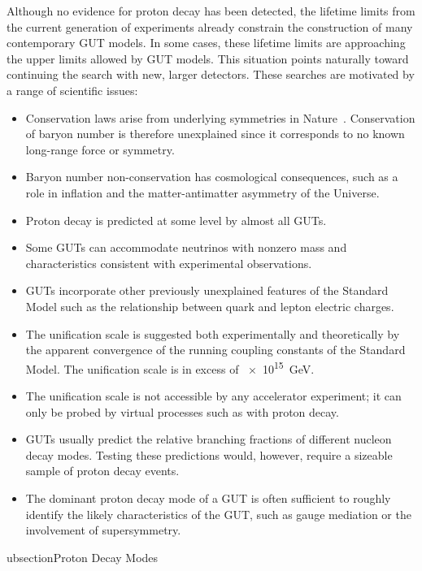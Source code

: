 Although no evidence for proton decay has been detected, the lifetime
limits from the current generation of experiments already constrain
the construction of many contemporary GUT %
models. In some cases, these lifetime limits are approaching the upper limits
allowed
by GUT models.
This situation points naturally toward continuing the search with new, larger
detectors.
These searches are motivated by a range of scientific issues:
\begin{itemize}
\item Conservation laws arise from underlying symmetries in
Nature~\cite{Noether:1918zz}.  
  Conservation of baryon number is therefore
  unexplained since it corresponds to no known long-range force or
  symmetry.
\item Baryon number non-conservation has cosmological consequences,
  such as a role in inflation and the matter-antimatter asymmetry of the
  Universe.
\item Proton decay is predicted at some level by almost all GUTs. 
\item Some GUTs can accommodate
  neutrinos with nonzero mass and characteristics consistent with
  experimental observations.
\item GUTs incorporate other previously unexplained features of
  the Standard Model such as the relationship between quark and lepton
  electric charges. 
\item The unification scale is suggested both experimentally and
  theoretically by the apparent convergence of the running coupling
  constants of the Standard Model. The unification scale is in excess of
\SI{e15}{GeV}.%
\item The unification scale is not accessible by any accelerator
  experiment; it can only be probed by virtual processes such as with
  proton decay.
\item GUTs usually predict the relative branching
  fractions of different nucleon decay modes. Testing these predictions
  would, however, require a sizeable sample of proton decay events.
\item The dominant proton decay mode of a GUT is often sufficient to roughly
  identify the likely characteristics of the GUT,
  such as gauge mediation or the involvement of supersymmetry.
\end{itemize}
ubsection{Proton Decay Modes} 

